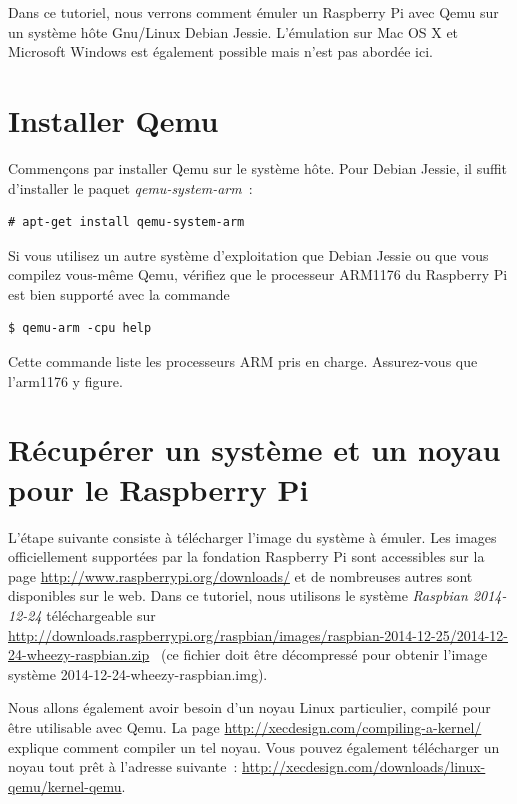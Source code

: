 \documentclass{article}
\begin{document}
Dans ce tutoriel, nous verrons comment émuler un Raspberry Pi avec Qemu sur un
système hôte Gnu/Linux Debian Jessie.
L'émulation sur Mac OS X et Microsoft Windows est également possible mais n'est
pas abordée ici.



\section{Installer Qemu}\label{sec:intall-qemu}

Commençons par installer Qemu sur le système hôte.  Pour Debian Jessie, il
suffit d'installer le paquet {\em qemu-system-arm}~:
\begin{verbatim}
# apt-get install qemu-system-arm
\end{verbatim}


Si vous utilisez un autre système d'exploitation que Debian Jessie ou que vous
compilez vous-même Qemu, vérifiez que le processeur ARM1176 du Raspberry Pi est
bien supporté avec la commande
\begin{verbatim}
$ qemu-arm -cpu help
\end{verbatim}
Cette commande liste les processeurs ARM pris en charge.
Assurez-vous que l'arm1176 y figure.



\section{Récupérer un système et un noyau pour le Raspberry Pi}\label{sec:get-distro-and-kernel}

L'étape suivante consiste à télécharger l'image du système à émuler.
Les images officiellement supportées par la fondation Raspberry Pi
sont accessibles sur la page
\url{http://www.raspberrypi.org/downloads/}
et de nombreuses autres sont disponibles sur le web.
%
Dans ce tutoriel, nous utilisons le système {\em Raspbian 2014-12-24}
téléchargeable sur
\url{http://downloads.raspberrypi.org/raspbian/images/raspbian-2014-12-25/2014-12-24-wheezy-raspbian.zip}~%
(ce fichier doit être décompressé pour obtenir l'image système
\og{}2014-12-24-wheezy-raspbian.img\fg{}).

Nous allons également avoir besoin d'un noyau Linux particulier, compilé pour
être utilisable avec Qemu.
La page
\href{https://web.archive.org/web/20150214035104/http://xecdesign.com/compiling-a-kernel/}{http://xecdesign.com/compiling-a-kernel/}
explique comment compiler un tel noyau.
Vous pouvez également télécharger un noyau tout prêt à l'adresse suivante~:
\href{https://web.archive.org/web/20150419093434/http://www.xecdesign.com/downloads/linux-qemu/kernel-qemu}{http://xecdesign.com/downloads/linux-qemu/kernel-qemu}.
\end{document}
